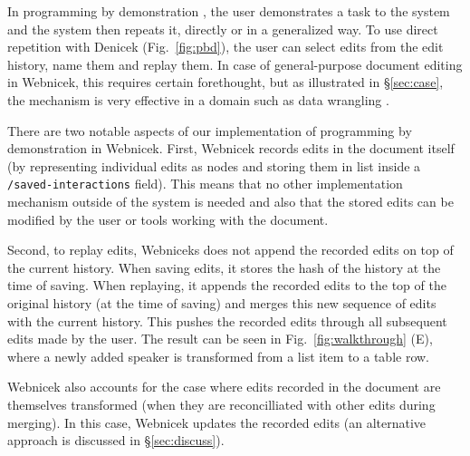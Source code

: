 \documentclass[sigconf,anonymous,screen]{acmart}
\begin{document}
In programming by demonstration \cite{cypher-1993-pbd}, the user demonstrates a task to the
system and the system then repeats it, directly or in a generalized way. To use direct
repetition with Denicek (Fig.~\ref{fig:pbd}), the user can select edits from the edit history,
name them and replay them. In case of general-purpose document editing in Webnicek, this requires
certain forethought, but as illustrated in \S\ref{sec:case}, the mechanism is very effective in
a domain such as data wrangling \cite{kandel-2011-wrangler}.

There are two notable aspects of our implementation of programming by demonstration in Webnicek.
First, Webnicek records edits in the document itself (by representing individual edits as nodes and
storing them in list inside a {\small\Verb_/saved-interactions_} field). This means that no other
implementation mechanism outside of the system is needed and also that the stored edits can be
modified by the user or tools working with the document.

Second, to replay edits, Webniceks does not append the recorded edits on top of the current history.
When saving edits, it stores the hash of the history at the time of saving. When replaying,
it appends the recorded edits to the top of the original history (at the time of saving) and merges
this new sequence of edits with the current history. This pushes the recorded edits through all
subsequent edits made by the user. The result can be seen in Fig.~\ref{fig:walkthrough} (E), where
a newly added speaker is transformed from a list item to a table row.

Webnicek also accounts for the case where edits recorded in the document are themselves
transformed (when they are reconcilliated with other edits during merging). In this case, Webnicek
updates the recorded edits (an alternative approach is discussed in \S\ref{sec:discuss}).

\end{document}

